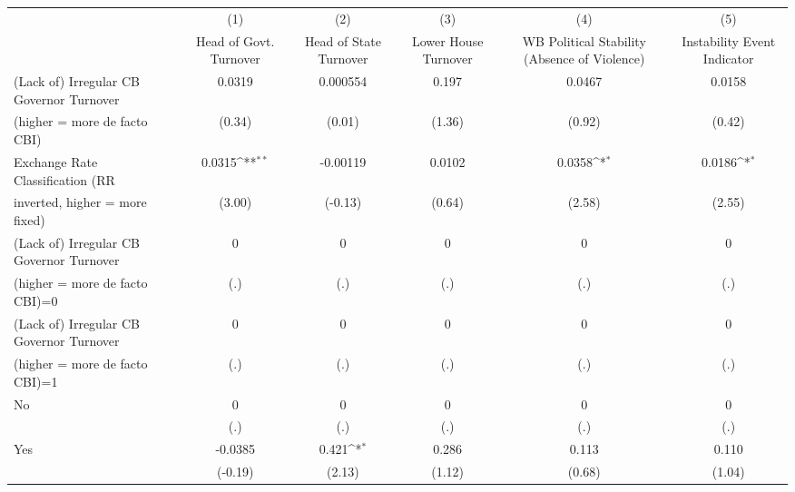 {
\def\sym#1{\ifmmode^{#1}\else\(^{#1}\)\fi}
\begin{tabular}{l*{5}{c}}
\toprule
                                        &\multicolumn{1}{c}{(1)}&\multicolumn{1}{c}{(2)}&\multicolumn{1}{c}{(3)}&\multicolumn{1}{c}{(4)}&\multicolumn{1}{c}{(5)}\\
                                        &\multicolumn{1}{c}{Head of Govt. Turnover}&\multicolumn{1}{c}{Head of State Turnover}&\multicolumn{1}{c}{Lower House Turnover}&\multicolumn{1}{c}{WB Political Stability (Absence of Violence)}&\multicolumn{1}{c}{Instability Event Indicator}\\
\midrule
(Lack of) Irregular CB Governor Turnover&0.0319         &0.000554         &0.197         &0.0467         &0.0158         \\
(higher = more de facto CBI)            &(0.34)         &(0.01)         &(1.36)         &(0.92)         &(0.42)         \\
\addlinespace
Exchange Rate Classification (RR        &0.0315\sym{**} &-0.00119         &0.0102         &0.0358\sym{*}  &0.0186\sym{*}  \\
inverted, higher = more fixed)          &(3.00)         &(-0.13)         &(0.64)         &(2.58)         &(2.55)         \\
\addlinespace
(Lack of) Irregular CB Governor Turnover&    0         &    0         &    0         &    0         &    0         \\
(higher = more de facto CBI)=0          &  (.)         &  (.)         &  (.)         &  (.)         &  (.)         \\
\addlinespace
(Lack of) Irregular CB Governor Turnover&    0         &    0         &    0         &    0         &    0         \\
(higher = more de facto CBI)=1          &  (.)         &  (.)         &  (.)         &  (.)         &  (.)         \\
\addlinespace
No                                      &    0         &    0         &    0         &    0         &    0         \\
                                        &  (.)         &  (.)         &  (.)         &  (.)         &  (.)         \\
\addlinespace
Yes                                     &-0.0385         &0.421\sym{*}  &0.286         &0.113         &0.110         \\
                                        &(-0.19)         &(2.13)         &(1.12)         &(0.68)         &(1.04)         \\

\end{tabular}}
